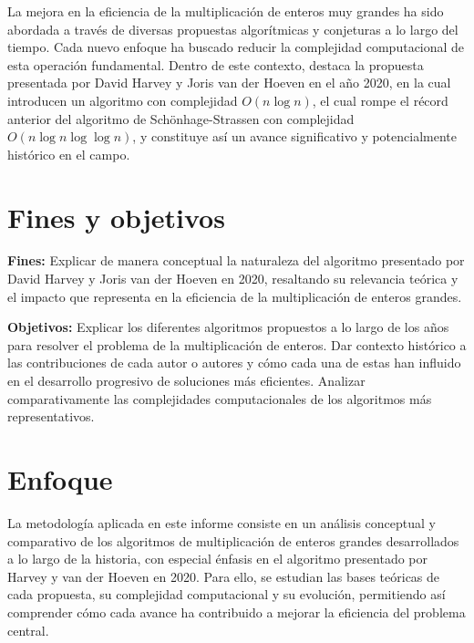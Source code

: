La mejora en la eficiencia de la multiplicación de enteros muy grandes ha sido abordada a través de diversas propuestas algorítmicas y conjeturas a lo largo del tiempo. Cada nuevo enfoque ha buscado reducir la complejidad computacional de esta operación fundamental. Dentro de este contexto, destaca la propuesta presentada por David Harvey y Joris van der Hoeven en el año 2020, en la cual introducen un algoritmo con complejidad \( O(n \log n) \), el cual rompe el récord anterior del algoritmo de Schönhage-Strassen con complejidad \( O(n \log n \log \log n) \), y constituye así un avance significativo y potencialmente histórico en el campo.

\section{Fines y objetivos}
\label{sec:intro_aims_obj}

\textbf{Fines:}
Explicar de manera conceptual la naturaleza del algoritmo presentado por David Harvey y Joris van der Hoeven en 2020, resaltando su relevancia teórica y el impacto que representa en la eficiencia de la multiplicación de enteros grandes.


\textbf{Objetivos:}
Explicar los diferentes algoritmos propuestos a lo largo de los años para resolver el problema de la multiplicación de enteros.
Dar contexto histórico a las contribuciones de cada autor o autores y cómo cada una de estas han influido en el desarrollo progresivo de soluciones más eficientes.
Analizar comparativamente las complejidades computacionales de los algoritmos más representativos.

\section{Enfoque}
\label{sec:intro_sol} %
La metodología aplicada en este informe consiste en un análisis conceptual y comparativo de los algoritmos de multiplicación de enteros grandes desarrollados a lo largo de la historia, con especial énfasis en el algoritmo presentado por Harvey y van der Hoeven en 2020. Para ello, se estudian las bases teóricas de cada propuesta, su complejidad computacional y su evolución, permitiendo así comprender cómo cada avance ha contribuido a mejorar la eficiencia del problema central.

